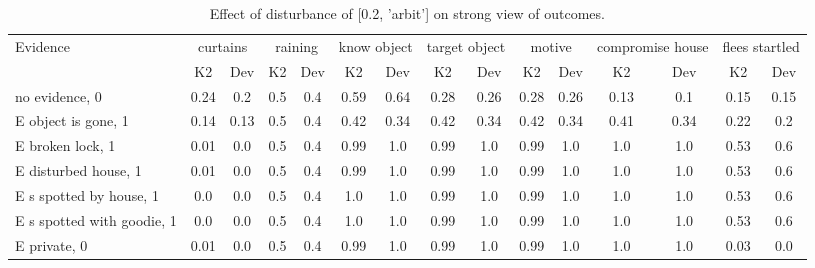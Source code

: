 \begin{table}\begin{tabular}{l|cc|cc|cc|cc|cc|cc|cc}\toprule\multirow{2}{*}{Evidence} & \multicolumn{2}{c}{curtains}& \multicolumn{2}{c}{raining}& \multicolumn{2}{c}{know object}& \multicolumn{2}{c}{target object}& \multicolumn{2}{c}{motive}& \multicolumn{2}{c}{compromise house}& \multicolumn{2}{c}{flees startled}\\& {K2} & {Dev}& {K2} & {Dev}& {K2} & {Dev}& {K2} & {Dev}& {K2} & {Dev}& {K2} & {Dev}& {K2} & {Dev}\\\midrule
no evidence, 0 & 0.24&0.2&\cellcolor{Bittersweet}0.5&\cellcolor{Bittersweet}0.4&\cellcolor{Bittersweet}0.59&\cellcolor{Bittersweet}0.64&0.28&0.26&0.28&0.26&0.13&0.1&0.15&0.15\\E object is gone, 1 & 0.14&0.13&\cellcolor{Bittersweet}0.5&\cellcolor{Bittersweet}0.4&\cellcolor{Bittersweet}0.42&\cellcolor{Bittersweet}0.34&\cellcolor{Bittersweet}0.42&\cellcolor{Bittersweet}0.34&\cellcolor{Bittersweet}0.42&\cellcolor{Bittersweet}0.34&\cellcolor{Bittersweet}0.41&\cellcolor{Bittersweet}0.34&0.22&0.2\\E broken lock, 1 & 0.01&0.0&\cellcolor{Bittersweet}0.5&\cellcolor{Bittersweet}0.4&0.99&1.0&0.99&1.0&0.99&1.0&1.0&1.0&\cellcolor{Bittersweet}0.53&\cellcolor{Bittersweet}0.6\\E disturbed house, 1 & 0.01&0.0&\cellcolor{Bittersweet}0.5&\cellcolor{Bittersweet}0.4&0.99&1.0&0.99&1.0&0.99&1.0&1.0&1.0&\cellcolor{Bittersweet}0.53&\cellcolor{Bittersweet}0.6\\E s spotted by house, 1 & 0.0&0.0&\cellcolor{Bittersweet}0.5&\cellcolor{Bittersweet}0.4&1.0&1.0&0.99&1.0&0.99&1.0&1.0&1.0&\cellcolor{Bittersweet}0.53&\cellcolor{Bittersweet}0.6\\E s spotted with goodie, 1 & 0.0&0.0&\cellcolor{Bittersweet}0.5&\cellcolor{Bittersweet}0.4&1.0&1.0&0.99&1.0&0.99&1.0&1.0&1.0&\cellcolor{Bittersweet}0.53&\cellcolor{Bittersweet}0.6\\E private, 0 & 0.01&0.0&\cellcolor{Bittersweet}0.5&\cellcolor{Bittersweet}0.4&0.99&1.0&0.99&1.0&0.99&1.0&1.0&1.0&0.03&0.0\\\bottomrule\end{tabular}\caption{Effect of disturbance of [0.2, 'arbit'] on strong view of outcomes.}\end{table}